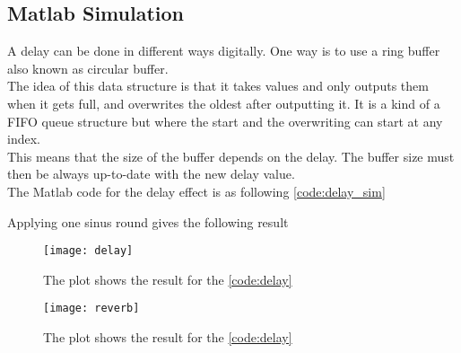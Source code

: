\subsection{Matlab Simulation}

A delay can be done in different ways digitally. One way is to use a ring buffer also known as circular buffer. \\
The idea of this data structure is that it takes values and only outputs them when it gets full, and overwrites the oldest after outputting it. It is a kind of a FIFO queue structure but where the start and the overwriting can start at any index. \\
This means that the size of the buffer depends on the delay.  The buffer size must then be always up-to-date with the new delay value. \\ 

The Matlab code for the delay effect is as following \autoref{code:delay_sim}

\label{code:delay_sim}


Applying one sinus round gives the following result

\begin{figure}[htbp]
	\centering
	\texttt{[image: delay]}
	\caption{The plot shows the result for the \autoref{code:delay}}
	\label{fig:delay_plot}
\end{figure}



\begin{figure}[htbp]
	\centering
	\texttt{[image: reverb]}
	\caption{The plot shows the result for the \autoref{code:delay}}
	\label{fig:delay_plot}
\end{figure}